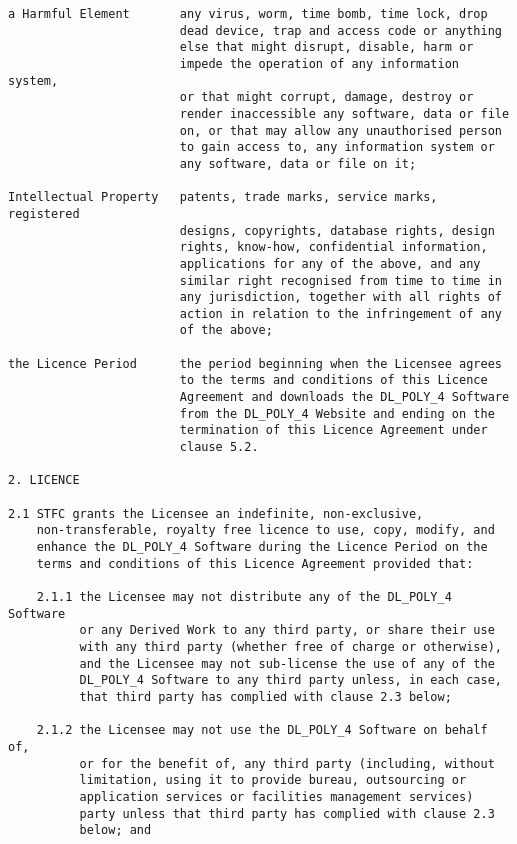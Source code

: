 \begin{verbatim}
a Harmful Element       any virus, worm, time bomb, time lock, drop
                        dead device, trap and access code or anything
                        else that might disrupt, disable, harm or
                        impede the operation of any information system,
                        or that might corrupt, damage, destroy or
                        render inaccessible any software, data or file
                        on, or that may allow any unauthorised person
                        to gain access to, any information system or
                        any software, data or file on it;

Intellectual Property   patents, trade marks, service marks, registered
                        designs, copyrights, database rights, design
                        rights, know-how, confidential information,
                        applications for any of the above, and any
                        similar right recognised from time to time in
                        any jurisdiction, together with all rights of
                        action in relation to the infringement of any
                        of the above;

the Licence Period      the period beginning when the Licensee agrees
                        to the terms and conditions of this Licence
                        Agreement and downloads the DL_POLY_4 Software
                        from the DL_POLY_4 Website and ending on the
                        termination of this Licence Agreement under
                        clause 5.2.

2. LICENCE

2.1 STFC grants the Licensee an indefinite, non-exclusive,
    non-transferable, royalty free licence to use, copy, modify, and
    enhance the DL_POLY_4 Software during the Licence Period on the
    terms and conditions of this Licence Agreement provided that:

    2.1.1 the Licensee may not distribute any of the DL_POLY_4 Software
          or any Derived Work to any third party, or share their use
          with any third party (whether free of charge or otherwise),
          and the Licensee may not sub-license the use of any of the
          DL_POLY_4 Software to any third party unless, in each case,
          that third party has complied with clause 2.3 below;

    2.1.2 the Licensee may not use the DL_POLY_4 Software on behalf of,
          or for the benefit of, any third party (including, without
          limitation, using it to provide bureau, outsourcing or
          application services or facilities management services)
          party unless that third party has complied with clause 2.3
          below; and


\end{verbatim}
